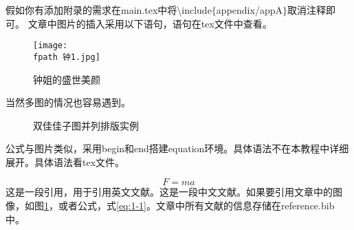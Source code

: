 假如你有添加附录的需求在main.tex中将\textbackslash include$\{$appendix/appA$\}$取消注释即可。
文章中图片的插入采用以下语句，语句在tex文件中查看。

\begin{figure}[h]
\centering
\texttt{[image: \\fpath 钟1.jpg]}
\caption{钟姐的盛世美颜}
\label{fig:zhong}
\vspace{-1em}
\end{figure}

当然多图的情况也容易遇到。

\begin{figure}[h]    %
  \centering %
  \caption{双佳佳子图并列排版实例}    %
  \label{fig:subfig_1}            %
\end{figure}

公式与图片类似，采用begin和end搭建equation环境。具体语法不在本教程中详细展开。具体语法看tex文件。

\begin{equation}
    F=ma
    \label{eq:1-1}
\end{equation}
这是一段引用，用于引用英文文献。\textsuperscript{\cite{wang2020recent}}这是一段中文文献。\textsuperscript{\cite{江少恩2009我国激光惯性约束聚变实验研究进展}}如果要引用文章中的图像，如图\ref{fig:zhong}，或者公式，式\ref{eq:1-1}。文章中所有文献的信息存储在reference.bib中。

